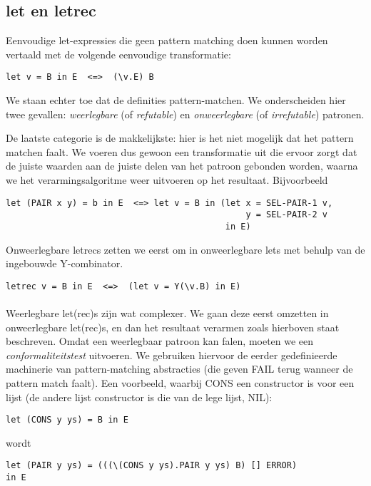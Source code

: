 \documentclass[a4paper,10pt]{article}
\begin{document}
\subsection{let en letrec}
Eenvoudige let-expressies die geen pattern matching doen kunnen worden vertaald met de volgende eenvoudige transformatie:
\begin{verbatim}
let v = B in E  <=>  (\v.E) B
\end{verbatim}
We staan echter toe dat de definities pattern-matchen. We onderscheiden hier twee gevallen: \emph{weerlegbare} (of \emph{refutable}) en \emph{onweerlegbare} (of \emph{irrefutable}) patronen.

De laatste categorie is de makkelijkste: hier is het niet mogelijk dat het pattern matchen faalt. We voeren dus gewoon een transformatie uit die ervoor zorgt dat de juiste waarden aan de juiste delen van het patroon gebonden worden, waarna we het verarmingsalgoritme weer uitvoeren op het resultaat. Bijvoorbeeld
\begin{verbatim}
let (PAIR x y) = b in E  <=> let v = B in (let x = SEL-PAIR-1 v,
                                               y = SEL-PAIR-2 v
                                           in E)
\end{verbatim}
Onweerlegbare letrecs zetten we eerst om in onweerlegbare lets met behulp van de ingebouwde Y-combinator.
\begin{verbatim}
letrec v = B in E  <=>  (let v = Y(\v.B) in E)
\end{verbatim}

\paragraph{}
Weerlegbare let(rec)s zijn wat complexer. We gaan deze eerst omzetten in onweerlegbare let(rec)s, en dan het resultaat verarmen zoals hierboven staat beschreven.
Omdat een weerlegbaar patroon kan falen, moeten we een \emph{conformaliteitstest} uitvoeren. We gebruiken hiervoor de eerder gedefinieerde machinerie van pattern-matching abstracties (die geven FAIL terug wanneer de pattern match faalt). Een voorbeeld, waarbij CONS een constructor is voor een lijst (de andere lijst constructor is die van de lege lijst, NIL):
\begin{verbatim}
let (CONS y ys) = B in E
\end{verbatim}
wordt
\begin{verbatim}
let (PAIR y ys) = (((\(CONS y ys).PAIR y ys) B) [] ERROR) 
in E
\end{verbatim}
\end{document}
